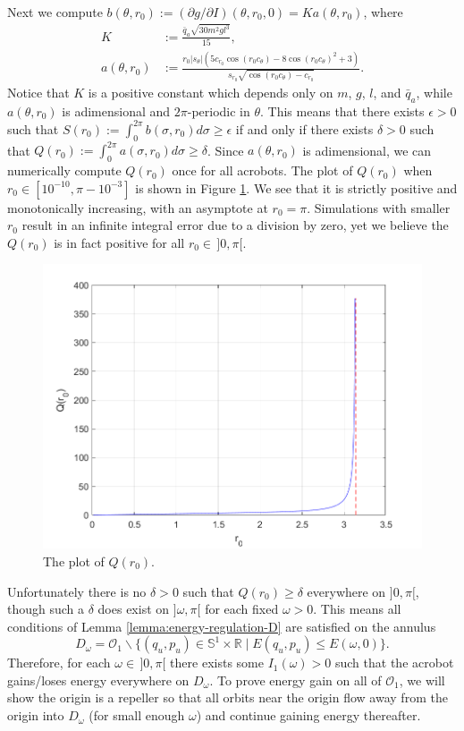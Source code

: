 \documentclass[journal,twoside,web, twocolumn,draftcls]{ieeecolor}
\newcommand*{\R}{\mathbb{R}}
\newcommand*{\Sone}{\mathbb{S}^1}
\newcommand*{\SxR}{\Sone \times \R}
\begin{document}
Next we compute
\(b(\theta,r_0) := (\partial g/\partial I)(\theta, r_0, 0) = K a(\theta,r_0)\),
where
\begin{align*}
    K &:= \frac{\bar{q}_a \sqrt{30m^2g l^3}}{15}
    , \\
    a(\theta,r_0) &:= \frac{
        r_0 |s_\theta| \left(
        5 c_{r_0} \cos(r_0 c_\theta) - 8 \cos(r_0c_\theta)^2 + 3
    \right)
    }{
    s_{r_0}\sqrt{\cos(r_0c_\theta) - c_{r_0}}
    }
    .
\end{align*}
Notice that \(K\) is a positive constant which depends only on
\(m\), \(g\), \(l\), and \(\bar{q}_a\), while \(a(\theta,r_0)\) is adimensional
and \(2\pi\)-periodic in \(\theta\).
This means that there exists \(\epsilon > 0\) such that 
\(S(r_0) := \int_0^{2\pi} b(\sigma,r_0)d\sigma \geq \epsilon\)
if and only if there exists \(\delta > 0\) such that 
\(Q(r_0) := \int_0^{2\pi} a(\sigma,r_0) d\sigma \geq \delta\).
Since \(a(\theta,r_0)\) is adimensional, we can numerically compute \(Q(r_0)\)
once for all acrobots.
The plot of \(Q(r_0)\) when \(r_0 \in [10^{-10}, \pi - 10^{-3}]\) is shown in
Figure \ref{fig:acrobot-Q}.
We see that it is strictly positive and monotonically increasing, with an
asymptote at \(r_0 = \pi\).
Simulations with smaller \(r_0\) result in an infinite integral error due to a
division by zero, yet we believe the \(Q(r_0)\) is in fact positive for all 
\(r_0 \in \, ]0,\pi[\).
\begin{figure}
    \centering
    \includegraphics[width=0.8\linewidth]{Qro.png}
    \caption{The plot of \(Q(r_0)\).}
    \label{fig:acrobot-Q}
\end{figure}

Unfortunately there is no \(\delta > 0\) such that \(Q(r_0) \geq \delta\)
everywhere on \(]0,\pi[\), though such a \(\delta\) does exist 
on \(]\omega,\pi[\) for each fixed \(\omega > 0\).
This means all conditions of Lemma \ref{lemma:energy-regulation-D}
are satisfied on the annulus
\[
    D_\omega = \mathcal{O}_1 \backslash 
    \{(q_u,p_u) \in \SxR \mid E(q_u,p_u) \leq E(\omega,0)\}
    .
\]
Therefore, for each \(\omega \in \, ]0,\pi[\) there exists some 
\(I_1(\omega) > 0\) such that the acrobot gains/loses energy everywhere on
\(D_\omega\).
To prove energy gain on all of \(\mathcal{O}_1\), we will show the origin is a
repeller so that all orbits near the origin flow away from the origin into
\(D_\omega\) (for small enough \(\omega\)) and continue gaining energy
thereafter.
\end{document}
